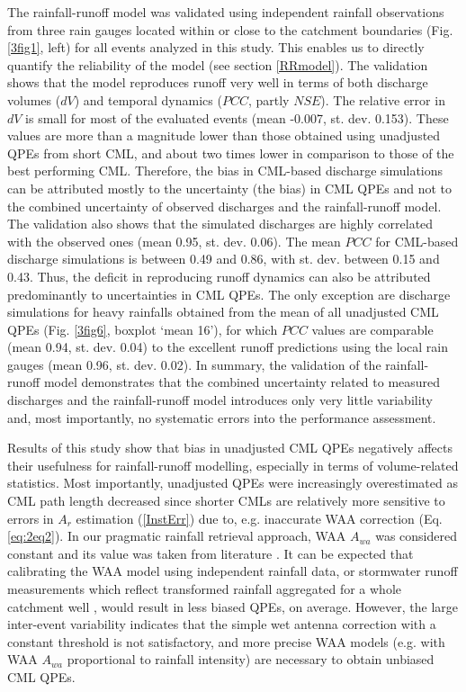 \documentclass{ctuthesis}\usepackage[]{graphicx}\usepackage[]{color}
\begin{document}
The rainfall-runoff model was validated using independent rainfall observations from three rain gauges located within or close to the catchment boundaries (Fig. \ref{3fig1}, left) for all events analyzed in this study. This enables us to directly quantify the reliability of the model (see section \ref{RRmodel}). The validation shows that the model reproduces runoff very well in terms of both discharge volumes ($dV$) and temporal dynamics ($PCC$, partly $NSE$). The relative error in $dV$ is small for most of the evaluated events (mean -0.007, st. dev. 0.153). These values are more than a magnitude lower than those obtained using unadjusted QPEs from short CML, and about two times lower in comparison to those of the best performing CML. Therefore, the bias in CML-based discharge simulations can be attributed mostly to the uncertainty (the bias) in CML QPEs and not to the combined uncertainty of observed discharges and the rainfall-runoff model. The validation also shows that the simulated discharges are highly correlated with the observed ones (mean 0.95, st. dev. 0.06). The mean $PCC$ for CML-based discharge simulations is between 0.49 and 0.86, with st. dev. between 0.15 and 0.43. Thus, the deficit in reproducing runoff dynamics can also be attributed predominantly to uncertainties in CML QPEs. The only exception are discharge simulations for heavy rainfalls obtained from the mean of all unadjusted CML QPEs (Fig. \ref{3fig6}, boxplot ‘mean 16’), for which $PCC$ values are comparable (mean 0.94, st. dev. 0.04) to the excellent runoff predictions using the local rain gauges (mean 0.96, st. dev. 0.02). In summary, the validation of the rainfall-runoff model demonstrates that the combined uncertainty related to measured discharges and the rainfall-runoff model introduces only very little variability and, most importantly, no systematic errors into the performance assessment.

Results of this study show that bias in unadjusted CML QPEs negatively affects their usefulness for rainfall-runoff modelling, especially in terms of volume-related statistics. Most importantly, unadjusted QPEs were increasingly overestimated as CML path length decreased since shorter CMLs are relatively more sensitive to errors in $A_r$ estimation (\ref{InstErr}) due to, e.g. inaccurate WAA correction (Eq. \ref{eq:2eq2}). In our pragmatic rainfall retrieval approach, WAA $A_{wa}$ was considered constant and its value was taken from literature \citep{overeemMeasuringUrbanRainfall2011}. It can be expected that calibrating the WAA model using independent rainfall data, or stormwater runoff measurements which reflect transformed rainfall aggregated for a whole catchment well \citep{pastorekCalibratingMicrowaveLink2019},  would result in less biased QPEs, on average. However, the large inter-event variability indicates that the simple wet antenna correction with a constant threshold is not satisfactory, and more precise WAA models (e.g. with WAA $A_{wa}$ proportional to rainfall intensity) are necessary to obtain unbiased CML QPEs.
 
\end{document}
